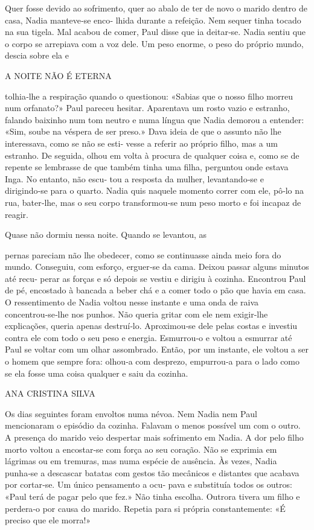 Quer fosse devido ao sofrimento, quer ao abalo de ter de novo o marido
dentro de casa, Nadia manteve‑se enco‑ lhida durante a refeição. Nem
sequer tinha tocado na sua tigela. Mal acabou de comer, Paul disse que
ia deitar‑se. Nadia sentiu que o corpo se arrepiava com a voz dele. Um
peso enorme, o peso do próprio mundo, descia sobre ela e

A NOITE NÃO É ETERNA

tolhia‑lhe a respiração quando o questionou: «Sabias que o nosso filho
morreu num orfanato?» Paul pareceu hesitar. Aparentava um rosto vazio e
estranho, falando baixinho num tom neutro e numa língua que Nadia
demorou a entender: «Sim, soube na véspera de ser preso.» Dava ideia de
que o assunto não lhe interessava, como se não se esti‑ vesse a referir
ao próprio filho, mas a um estranho. De seguida, olhou em volta à
procura de qualquer coisa e, como se de repente se lembrasse de que
também tinha uma filha, perguntou onde estava Inga. No entanto, não
escu‑ tou a resposta da mulher, levantando‑se e dirigindo‑se para o
quarto. Nadia quis naquele momento correr com ele, pô‑lo na rua,
bater‑lhe, mas o seu corpo transformou‑se num peso morto e foi incapaz
de reagir.

Quase não dormiu nessa noite. Quando se levantou, as

pernas pareciam não lhe obedecer, como se continuasse ainda meio fora do
mundo. Conseguiu, com esforço, erguer‑se da cama. Deixou passar alguns
minutos até recu‑ perar as forças e só depois se vestiu e dirigiu à
cozinha. Encontrou Paul de pé, encostado à bancada a beber chá e a comer
todo o pão que havia em casa. O ressentimento de Nadia voltou nesse
instante e uma onda de raiva concentrou‑se‑lhe nos punhos. Não queria
gritar com ele nem exigir‑lhe explicações, queria apenas destruí‑lo.
Aproximou‑se dele pelas costas e investiu contra ele com todo o seu peso
e energia. Esmurrou‑o e voltou a esmurrar até Paul se voltar com um
olhar assombrado. Então, por um instante, ele voltou a ser o homem que
sempre fora: olhou‑a com desprezo, empurrou‑a para o lado como se ela
fosse uma coisa qualquer e saiu da cozinha.

ANA CRISTINA SILVA

Os dias seguintes foram envoltos numa névoa. Nem Nadia nem Paul
mencionaram o episódio da cozinha. Falavam o menos possível um com o
outro. A presença do marido veio despertar mais sofrimento em Nadia. A
dor pelo filho morto voltou a encostar‑se com força ao seu coração. Não
se exprimia em lágrimas ou em tremuras, mas numa espécie de ausência. Às
vezes, Nadia punha‑se a descascar batatas com gestos tão mecânicos e
distantes que acabava por cortar‑se. Um único pensamento a ocu‑ pava e
substituía todos os outros: «Paul terá de pagar pelo que fez.» Não tinha
escolha. Outrora tivera um filho e perdera‑o por causa do marido.
Repetia para si própria constantemente: «É preciso que ele morra!»

